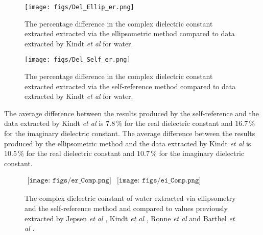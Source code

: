 \begin{figure}[H]
\begin{center}
\texttt{[image: figs/Del\_Ellip\_er.png]}
\end{center}
\caption[Dielectric constant error two layer system - ellipsometry]{\label{fig:DelErEll} The percentage difference in the complex dielectric constant extracted extracted via the ellipsometric method compared to data extracted by Kindt \textit{et al} \cite{Kindt1996} for water.}
\end{figure}

\begin{figure}[H]
\begin{center}
\texttt{[image: figs/Del\_Self\_er.png]}
\end{center}
\caption[Dielectric constant error two layer system - self-reference]{\label{fig:DelErSelf} The percentage difference in the complex dielectric constant extracted extracted via the self-reference method compared to data extracted by Kindt \textit{et al} \cite{Kindt1996} for water.}
\end{figure}

The average difference between the results produced by the self-reference and the data extracted by Kindt \textit{et al} is $7.8\,\%$ for the real dielectric constant and $16.7\,\%$ for the imaginary dielectric constant. The average difference between the results produced by the ellipsometric method and the data extracted by Kindt \textit{et al} is $10.5\,\%$ for the real dielectric constant and $10.7\,\%$ for the imaginary dielectric constant.

\begin{figure}[H]
                \begin{center}$
								\begin{array}{cc}
                \texttt{[image: figs/er\_Comp.png]}&
                \texttt{[image: figs/ei\_Comp.png]}
								\end{array}$
								\end{center}
	\caption[Comparative complex dielectric constant]{The complex dielectric constant of water extracted via ellipsometry and the self-reference method and compared to values previously extracted by Jepsen \textit{et al} \cite{Jepsen-2007}, Kindt \textit{et al} \cite{Kindt1996}, Ronne \textit{et al} \cite{Ronne1997} and Barthel \textit{et al} \cite{Barthel1990}.}
	\label{fig:CuvetteDiaComp}
\end{figure}

